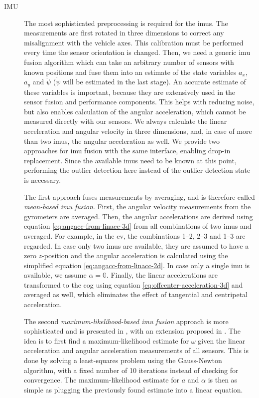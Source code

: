 \begin{description}
\item[IMU] The most sophisticated preprocessing is required for the \glspl{imu}. The measurements are first rotated in three dimensions to correct any misalignment with the vehicle axes. This calibration must be performed every time the sensor orientation is changed. Then, we need a generic \gls{imu} fusion algorithm which can take an arbitrary number of sensors with known positions and fuse them into an estimate of the state variables $a_x$, $a_y$ and $\ddot{\psi}$ ($\dot{\psi}$ will be estimated in the last stage). An accurate estimate of these variables is important, because they are extensively used in the sensor fusion and performance components. This helps with reducing noise, but also enables calculation of the angular acceleration, which cannot be measured directly with our sensors. We always calculate the linear acceleration and angular velocity in three dimensions, and, in case of more than two \glspl{imu}, the angular acceleration as well. We provide two approaches for \gls{imu} fusion with the same interface, enabling drop-in replacement. Since the available \glspl{imu} need to be known at this point, performing the outlier detection here instead of the outlier detection state is necessary.

The first approach fuses measurements by averaging, and is therefore called \textit{mean-based \gls{imu} fusion}. First, the angular velocity measurements from the gyrometers are averaged. Then, the angular accelerations are derived using equation \ref{eq:angacc-from-linacc-3d} from all combinations of two \glspl{imu} and averaged. For example, in the \gls{ev}, the combinations 1--2, 2--3 and 1--3 are regarded. In case only two \glspl{imu} are available, they are assumed to have a zero $z$-position and the angular acceleration is calculated using the simplified equation \ref{eq:angacc-from-linacc-2d}. In case only a single \gls{imu} is available, we assume $\alpha = \mathbb{0}$. Finally, the linear accelerations are transformed to the \gls{cog} using equation \ref{eq:offcenter-acceleration-3d} and averaged as well, which eliminates the effect of tangential and centripetal acceleration.

The second \textit{maximum-likelihood-based \gls{imu} fusion} approach is more sophisticated and is presented in \cite{Skog.2016}, with an extension proposed in \cite{Wahlstrom.2018}. The idea is to first find a maximum-likelihood estimate for $\omega$ given the linear acceleration and angular acceleration measurements of all sensors. This is done by solving a least-squares problem using the Gauss-Newton algorithm, with a fixed number of 10 iterations instead of checking for convergence. The maximum-likelihood estimate for $a$ and $\alpha$ is then as simple as plugging the previously found estimate into a linear equation.


\end{description}

